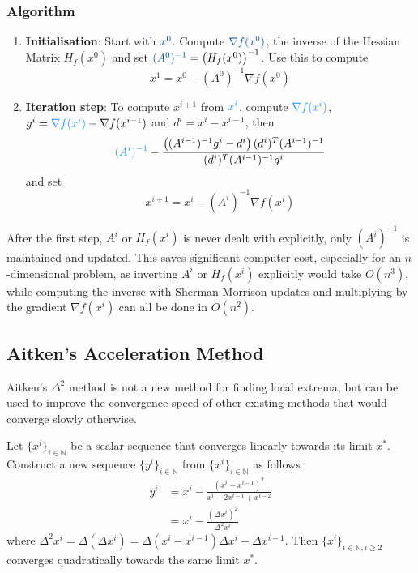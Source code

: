 \documentclass[11pt]{article}
\begin{document}
\subsubsection{Algorithm}
\begin{enumerate}
	\item \textbf{Initialisation}: Start with ${\color{DodgerBlue4} x^0}$. Compute ${\color{DodgerBlue4} \nabla f(x^0)}$, the inverse of the Hessian Matrix $H_f(x^0)$ and set ${\color{DodgerBlue4} (A^0)^{-1}} = \left(H_f(x^0)\right)^{-1} $. Use this to compute
	\begin{equation*}
		x^1 = x^0 - (A^0)^{-1}\nabla f(x^0)
	\end{equation*}
	\item \textbf{Iteration step}: To compute $x^{i+1}$ from ${\color{DodgerBlue1} x^i}$, compute ${\color{DodgerBlue1} \nabla f(x^i)}$, $g^i = {\color{DodgerBlue1} \nabla f(x^i)} - \nabla f(x^{i-1})$ and $d^i = x^i - x^{i-1}$, then
	\begin{equation*}
		{\color{DodgerBlue1}(A^{i})^{-1}} - \frac{\left((A^{i-1})^{-1}g^i-d^i\right)(d^i)^T(A^{i-1})^{-1}}{(d^i)^T(A^{i-1})^{-1}g^i}
	\end{equation*}
	and set
	\begin{equation*}
		x^{i+1} = x^i - (A^i)^{-1} \nabla f(x^i)
	\end{equation*}
\end{enumerate}

After the first step, $A^i$ or $H_f(x^i)$ is never dealt with explicitly, only $(A^i)^{-1}$ is maintained and updated. This saves significant computer cost, especially for an $n$-dimensional problem, as inverting $A^i$ or $ H_f(x^i)$ explicitly would take $O(n^3)$, while computing the inverse with Sherman-Morrison updates and multiplying by the gradient $\nabla f(x^i)$ can all be done in $O(n^2)$.

\subsection{Aitken's Acceleration Method}
Aitken's $\Delta^2$ method is not a new method for finding local extrema, but can be used to improve the convergence speed of other existing methods that would converge slowly otherwise.

Let $\{x^i\}_{i\in\mathbb{N}}$ be a scalar sequence that converges linearly towards its limit $x^*$. Construct a new sequence $\{y^i\}_{i\in\mathbb{N}}$ from $\{x^i\}_{i\in\mathbb{N}}$ as follows
\begin{align*}
y^i &= x^i - \frac{(x^i - x^{i-1})^2}{x^i - 2x^{i-1} + x^{i-2}}\\
&= x^i - \frac{(\Delta x^i)^2}{\Delta^2 x^i}
\end{align*}
where $\Delta^2 x^i = \Delta(\Delta x^i) = \Delta(x^i - x^{i-1}) \Delta x^i - \Delta x^{i-1}$. Then $\{x^i\}_{i\in\mathbb{N}, i\geq 2}$ converges quadratically towards the same limit $x^*$.
\end{document}
